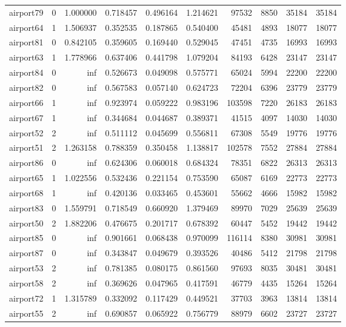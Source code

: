 \documentclass[../../../thesis.tex]{subfiles}
\begin{document}
\begin{longtable}{|l|r|r|r|r|r|r|r|r|r|}
airport79 & 0 & 1.000000 & 0.718457 & 0.496164 & 1.214621 & 97532 & 8850 & 35184 & 35184 \\
airport64 & 1 & 1.506937 & 0.352535 & 0.187865 & 0.540400 & 45481 & 4893 & 18077 & 18077 \\
airport81 & 0 & 0.842105 & 0.359605 & 0.169440 & 0.529045 & 47451 & 4735 & 16993 & 16993 \\
airport63 & 1 & 1.778966 & 0.637406 & 0.441798 & 1.079204 & 84193 & 6428 & 23147 & 23147 \\
airport84 & 0 & inf & 0.526673 & 0.049098 & 0.575771 & 65024 & 5994 & 22200 & 22200 \\
airport82 & 0 & inf & 0.567583 & 0.057140 & 0.624723 & 72204 & 6396 & 23779 & 23779 \\
airport66 & 1 & inf & 0.923974 & 0.059222 & 0.983196 & 103598 & 7220 & 26183 & 26183 \\
airport67 & 1 & inf & 0.344684 & 0.044687 & 0.389371 & 41515 & 4097 & 14030 & 14030 \\
airport52 & 2 & inf & 0.511112 & 0.045699 & 0.556811 & 67308 & 5549 & 19776 & 19776 \\
airport51 & 2 & 1.263158 & 0.788359 & 0.350458 & 1.138817 & 102578 & 7552 & 27884 & 27884 \\
airport86 & 0 & inf & 0.624306 & 0.060018 & 0.684324 & 78351 & 6822 & 26313 & 26313 \\
airport65 & 1 & 1.022556 & 0.532436 & 0.221154 & 0.753590 & 65087 & 6169 & 22773 & 22773 \\
airport68 & 1 & inf & 0.420136 & 0.033465 & 0.453601 & 55662 & 4666 & 15982 & 15982 \\
airport83 & 0 & 1.559791 & 0.718549 & 0.660920 & 1.379469 & 89970 & 7029 & 25639 & 25639 \\
airport50 & 2 & 1.882206 & 0.476675 & 0.201717 & 0.678392 & 60447 & 5452 & 19442 & 19442 \\
airport85 & 0 & inf & 0.901661 & 0.068438 & 0.970099 & 116114 & 8380 & 30981 & 30981 \\
airport87 & 0 & inf & 0.343847 & 0.049679 & 0.393526 & 40486 & 5412 & 21798 & 21798 \\
airport53 & 2 & inf & 0.781385 & 0.080175 & 0.861560 & 97693 & 8035 & 30481 & 30481 \\
airport58 & 2 & inf & 0.369626 & 0.047965 & 0.417591 & 46779 & 4435 & 15264 & 15264 \\
airport72 & 1 & 1.315789 & 0.332092 & 0.117429 & 0.449521 & 37703 & 3963 & 13814 & 13814 \\
airport55 & 2 & inf & 0.690857 & 0.065922 & 0.756779 & 88979 & 6602 & 23727 & 23727 \\

\end{longtable}
\end{document}
